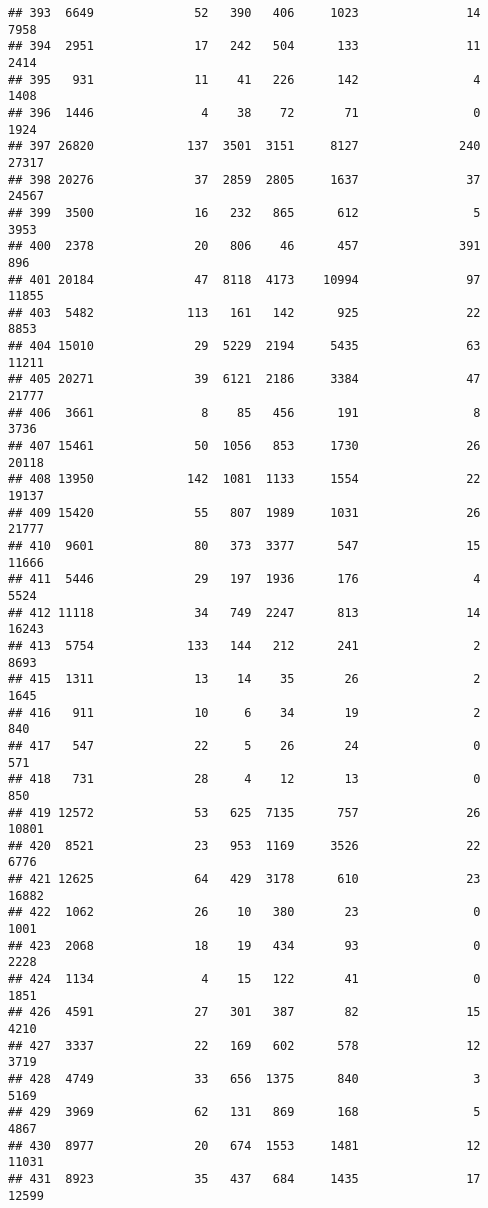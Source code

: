 \documentclass[
]{article}
\begin{document}
\begin{verbatim}
## 393  6649              52   390   406     1023               14  7958
## 394  2951              17   242   504      133               11  2414
## 395   931              11    41   226      142                4  1408
## 396  1446               4    38    72       71                0  1924
## 397 26820             137  3501  3151     8127              240 27317
## 398 20276              37  2859  2805     1637               37 24567
## 399  3500              16   232   865      612                5  3953
## 400  2378              20   806    46      457              391   896
## 401 20184              47  8118  4173    10994               97 11855
## 403  5482             113   161   142      925               22  8853
## 404 15010              29  5229  2194     5435               63 11211
## 405 20271              39  6121  2186     3384               47 21777
## 406  3661               8    85   456      191                8  3736
## 407 15461              50  1056   853     1730               26 20118
## 408 13950             142  1081  1133     1554               22 19137
## 409 15420              55   807  1989     1031               26 21777
## 410  9601              80   373  3377      547               15 11666
## 411  5446              29   197  1936      176                4  5524
## 412 11118              34   749  2247      813               14 16243
## 413  5754             133   144   212      241                2  8693
## 415  1311              13    14    35       26                2  1645
## 416   911              10     6    34       19                2   840
## 417   547              22     5    26       24                0   571
## 418   731              28     4    12       13                0   850
## 419 12572              53   625  7135      757               26 10801
## 420  8521              23   953  1169     3526               22  6776
## 421 12625              64   429  3178      610               23 16882
## 422  1062              26    10   380       23                0  1001
## 423  2068              18    19   434       93                0  2228
## 424  1134               4    15   122       41                0  1851
## 426  4591              27   301   387       82               15  4210
## 427  3337              22   169   602      578               12  3719
## 428  4749              33   656  1375      840                3  5169
## 429  3969              62   131   869      168                5  4867
## 430  8977              20   674  1553     1481               12 11031
## 431  8923              35   437   684     1435               17 12599

\end{verbatim}
\end{document}

